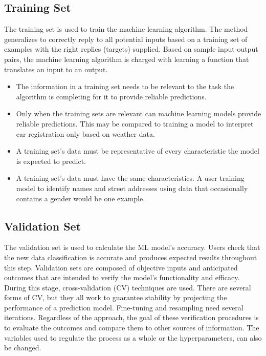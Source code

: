 \subsection{Training Set}

The training set is used to train the machine learning algorithm. The method generalizes to correctly reply to all potential inputs based on a training set of examples with the right replies (targets) supplied. Based on sample input-output pairs, the machine learning algorithm is charged with learning a function that translates an input to an output. 

\begin{itemize}
    \item The information in a training set needs to be relevant to the task the algorithm is completing for it to provide reliable predictions. 
\item Only when the training sets are relevant can machine learning models provide reliable predictions. This may be compared to training a model to interpret car registration only based on weather data.
\item A training set's data must be representative of every characteristic the model is expected to predict.
\item A training set's data must have the same characteristics. A user training model to identify names and street addresses using data that occasionally contains a gender would be one example. 

\end{itemize}


\subsection{Validation Set}

The validation set is used to calculate the ML model's accuracy. Users check that the new data classification is accurate and produces expected results throughout this step. Validation sets are composed of objective inputs and anticipated outcomes that are intended to verify the model's functionality and efficacy. During this stage, cross-validation (CV) techniques are used. There are several forms of CV, but they all work to guarantee stability by projecting the performance of a prediction model.
Fine-tuning and resampling need several iterations. Regardless of the approach, the goal of these verification procedures is to evaluate the outcomes and compare them to other sources of information. The variables used to regulate the process as a whole or the hyperparameters, can also be changed.

